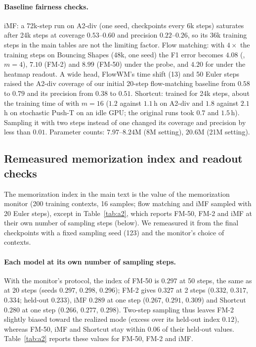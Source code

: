 \paragraph{Baseline fairness checks.}
iMF: a 72k-step run on A2-div (one seed, checkpoints every 6k steps) saturates after 24k steps at coverage $0.53$--$0.60$ and precision $0.22$--$0.26$, so its 36k training steps in the main tables are not the limiting factor. Flow matching: with $4\times$ the training steps on Bouncing Shapes (48k, one seed) the F1 error becomes $4.08$ (\imlewm{}, $m{=}4$), $7.10$ (FM-2) and $8.99$ (FM-50) under the probe, and $4.20$ for \imlewm{} under the heatmap readout. A wide head, FlowWM's time shift (13) and 50 Euler steps raised the A2-div coverage of our initial 20-step flow-matching baseline from $0.58$ to $0.79$ and its precision from $0.38$ to $0.51$. Shortcut: trained for 24k steps, about the training time of \imlewm{} with $m{=}16$ ($1.2$ against $1.1$\,h on A2-div and $1.8$ against $2.1$\,h on stochastic Push-T on an idle GPU; the original runs took $0.7$ and $1.5$\,h). Sampling it with two steps instead of one changed its coverage and precision by less than $0.01$. Parameter counts: $7.97$--$8.24$M (8M setting), $20.6$M (21M setting).


\subsection{Remeasured memorization index and readout checks}
\label{app:memo}
The memorization index in the main text is the value of the memorization monitor (200 training contexts, 16 samples; flow matching and iMF sampled with 20 Euler steps), except in Table~\ref{tab:a2}, which reports FM-50, FM-2 and iMF at their own number of sampling steps (below). We remeasured it from the final checkpoints with a fixed sampling seed (123) and the monitor's choice of contexts.

\paragraph{Each model at its own number of sampling steps.} With the monitor's protocol, the index of FM-50 is $0.297$ at 50 steps, the same as at 20 steps (seeds $0.297$, $0.298$, $0.296$); FM-2 gives $0.327$ at 2 steps ($0.332$, $0.317$, $0.334$; held-out $0.233$), iMF $0.289$ at one step ($0.267$, $0.291$, $0.309$) and Shortcut $0.280$ at one step ($0.266$, $0.277$, $0.298$). Two-step sampling thus leaves FM-2 slightly biased toward the realized mode (excess over its held-out index $0.12$), whereas FM-50, iMF and Shortcut stay within $0.06$ of their held-out values. Table~\ref{tab:a2} reports these values for FM-50, FM-2 and iMF.

